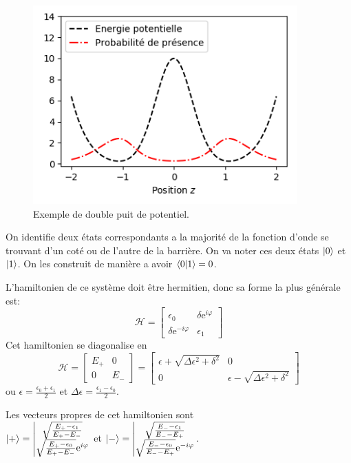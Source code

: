 \documentclass[11pt,a4paper]{article}
\begin{document}
	\begin{figure}[!ht]
		\centering
		\includegraphics[width=4in]{DbleWell}
		\caption{Exemple de double puit de potentiel.}
		\label{fig:dblewell}
	\end{figure}
	
	\noindent On identifie deux états correspondants a la majorité de la fonction d'onde se trouvant d'un coté ou de l'autre de la barrière. On va noter ces deux états $\ket{0}$ et $\ket{1}$. On les construit de manière a avoir $\braket{0|1}=0$.
	
	L'hamiltonien de ce système doit être hermitien, donc sa forme la plus générale est:
	\[
		\mathcal{H}=\left[\begin{matrix}
		\epsilon_0 & \delta\textrm{e}^{i\varphi}\\
		\delta\textrm{e}^{-i\varphi} & \epsilon_1
		\end{matrix}\right]
	\]
	Cet hamiltonien se diagonalise en
	\[
	\mathcal{H}=\left[\begin{matrix}
	E_+ & 0\\
	0 & E_-
	\end{matrix}\right]=
	\left[\begin{matrix}
	\epsilon+\sqrt{\Delta\epsilon^2+\delta^2} & 0\\
	0 & \epsilon-	\sqrt{\Delta\epsilon^2+\delta^2}
	\end{matrix}\right]
	\]
	ou $\displaystyle \epsilon=\frac{\epsilon_0+\epsilon_1}{2}$ et $\displaystyle \Delta\epsilon=\frac{\epsilon_1-\epsilon_0}{2}$.
	
	\noindent Les vecteurs propres de cet hamiltonien sont\\ $\ket{+}=
	\left|\begin{matrix}
	\sqrt{\frac{E_+-\epsilon_1}{E_+-E_-}}\\
	\sqrt{\frac{E_+-\epsilon_0}{E_+-E_-}}\textrm{e}^{i\varphi}
	\end{matrix}\right.$ 
	et $\ket{-}=
	\left|\begin{matrix}
	\sqrt{\frac{E_--\epsilon_1}{E_--E_+}}\\
	\sqrt{\frac{E_--\epsilon_0}{E_--E_+}}\textrm{e}^{-i\varphi}
	\end{matrix}\right.$.
	
\end{document}
